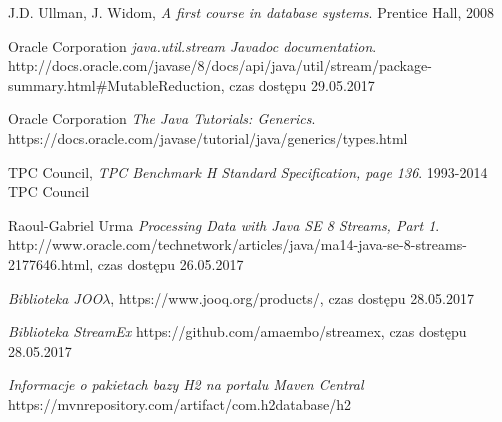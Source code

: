 \documentclass[12pt]{extarticle}
\begin{document}
\begin{thebibliography}{9}

        J.D. Ullman, J. Widom,
        \textit{A first course in database systems}. 
        Prentice Hall, 2008

        Oracle Corporation
        \textit{java.util.stream Javadoc documentation}. 
        http://docs.oracle.com/javase/8/docs/api/java/util/stream/package-summary.html\#MutableReduction, czas dostępu 29.05.2017

        Oracle Corporation
        \textit{The Java Tutorials: Generics}. 
        https://docs.oracle.com/javase/tutorial/java/generics/types.html

        TPC Council,
        \textit{TPC Benchmark H Standard Specification, page 136}. 
        1993-2014 TPC Council

        Raoul-Gabriel Urma
        \textit{Processing Data with Java SE 8 Streams, Part 1}. 
        http://www.oracle.com/technetwork/articles/java/ma14-java-se-8-streams-2177646.html, czas dostępu 26.05.2017

        \textit{Biblioteka JOO$\lambda$}, https://www.jooq.org/products/, czas dostępu 28.05.2017

        \textit{Biblioteka StreamEx} https://github.com/amaembo/streamex, czas dostępu 28.05.2017

        \textit{Informacje o pakietach bazy H2 na portalu Maven Central} https://mvnrepository.com/artifact/com.h2database/h2

\end{thebibliography}
\end{document}
